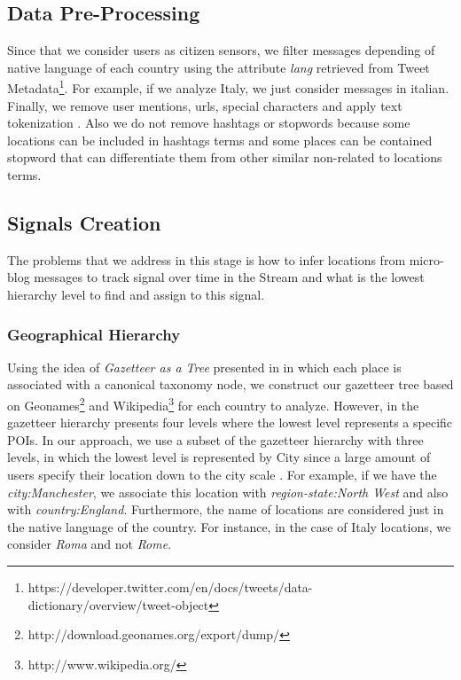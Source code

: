 \documentclass[sigconf]{acmart}
\begin{document}
\subsection{Data Pre-Processing}

Since that we consider users as citizen sensors, we filter messages depending of native language of each country using the attribute \textit{lang} retrieved from Tweet Metadata\footnote{https://developer.twitter.com/en/docs/tweets/data-dictionary/overview/tweet-object}. For example, if we analyze Italy, we just consider messages in italian. Finally, we remove user mentions, urls,  special characters and apply text tokenization . Also we do not remove hashtags or stopwords because some locations can be included in hashtags terms and some places can be contained stopword that can differentiate them from other similar non-related to locations terms.




\subsection{Signals Creation}
The problems that we address in this stage is how to infer locations from micro-blog messages to track signal over time in the Stream and what is the lowest hierarchy level to find and assign to this signal.

\subsubsection{Geographical Hierarchy}\label{sssec:geohie}
Using the idea of \textit{Gazetteer as a Tree} presented in \cite{yin2014pinpointing} in which each place is associated with a canonical taxonomy node, we construct our gazetteer tree based on Geonames\footnote{http://download.geonames.org/export/dump/} and Wikipedia\footnote{http://www.wikipedia.org/} for each country to analyze. However, in \cite{yin2014pinpointing} the gazetteer hierarchy presents four levels where the lowest level represents a specific POIs. In our approach, we use a subset of the gazetteer hierarchy with three levels, in which the lowest level is represented by City since a large amount of users specify their location down to the city scale \cite{hecht2011tweets}. For example, if we have the \textit{city:Manchester}, we associate this location with \textit{region-state:North West} and also with \textit{country:England}. Furthermore, the name of locations are considered just in the native language of the country. For instance, in the case of Italy locations, we consider \textit{Roma} and not \textit{Rome}.
\end{document}
